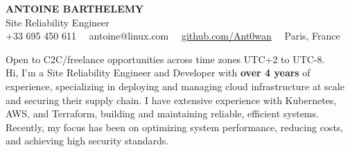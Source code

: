 \documentclass[10pt]{developercv}
\begin{document}
\begin{center}
    {\huge\textbf{\MakeUppercase{Antoine Barthelemy}}} \\
    \vspace{4pt}
    {\LARGE Site Reliability Engineer} \\
    \vspace{4pt}
	+33 695 450 611 \ \ antoine@linux.com \ \ \href{https://github.com/Ant0wan}{github.com/Ant0wan} \ \ Paris, France
\end{center}

\hspace{0pt}
\begin{minipage}[t]{1.00\textwidth}
\vspace{0pt}
	{Open to C2C/freelance opportunities across time zones UTC+2 to UTC-8.\\Hi, I’m a Site Reliability Engineer and Developer with \textbf{over 4 years} of experience, specializing in deploying and managing cloud infrastructure at scale and securing their supply chain. I have extensive experience with Kubernetes, AWS, and Terraform, building and maintaining reliable, efficient systems. Recently, my focus has been on optimizing system performance, reducing costs, and achieving high security standards.}
\end{minipage}
\vspace{6pt}
\hfill

\end{document}
